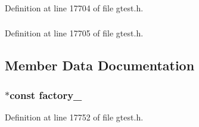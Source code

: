 \hypertarget{classtesting_1_1TestInfo_ab085d1bf4cff8b1045750706b11f8662}{
\subsubsection[{\-Test}]{}}\label{df/d65/classtesting_1_1TestInfo_ab085d1bf4cff8b1045750706b11f8662}


\-Definition at line 17704 of file gtest.\-h.

\hypertarget{classtesting_1_1TestInfo_a61fe0349d692eb6d4f5b94e35049b2e9}{
\subsubsection[{\-Test\-Case}]{}}\label{df/d65/classtesting_1_1TestInfo_a61fe0349d692eb6d4f5b94e35049b2e9}


\-Definition at line 17705 of file gtest.\-h.



\subsection{\-Member \-Data \-Documentation}
\hypertarget{classtesting_1_1TestInfo_a2025913d1ebb2135b3296dfbf0cf1875}{
\subsubsection[{factory\-\_\-}]{ $\ast$const {\bf factory\-\_\-}}}\label{df/d65/classtesting_1_1TestInfo_a2025913d1ebb2135b3296dfbf0cf1875}


\-Definition at line 17752 of file gtest.\-h.

